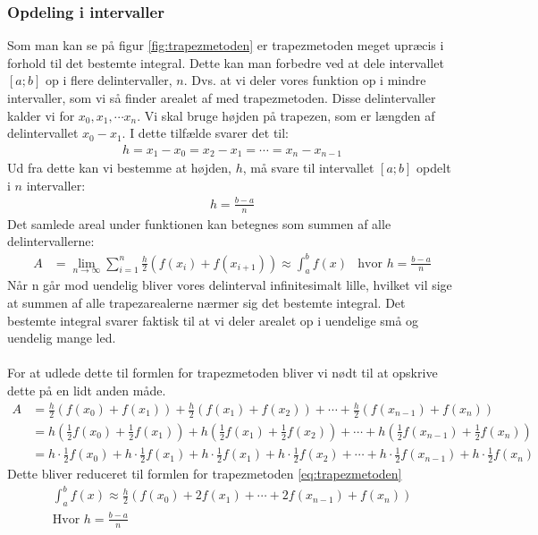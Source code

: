 \documentclass[12pt]{article}
\numberwithin{equation}{section}
\begin{document}
\subsubsection{Opdeling i intervaller}
\label{sec:opdelingtrapezmetoden}
Som man kan se på figur \ref{fig:trapezmetoden} er trapezmetoden meget upræcis i forhold til det bestemte integral. Dette kan man forbedre ved at dele intervallet $[a;b]$ op i flere delintervaller, $n$. Dvs. at vi deler vores funktion op i mindre intervaller, som vi så finder arealet af med trapezmetoden. Disse delintervaller kalder vi for $x_0, x_1, \cdots x_n$. Vi skal bruge højden på trapezen, som er længden af delintervallet $x_0 - x_1$. I dette tilfælde svarer det til:
\begin{align}
h = x_1-x_0 = x_2-x_1 = \cdots = x_n - x_{n-1}
\end{align}
Ud fra dette kan vi bestemme at højden, $h$, må svare til intervallet $[a;b]$ opdelt i $n$ intervaller:
\begin{align}
h=\frac{b-a}{n}
\end{align}
Det samlede areal under funktionen kan betegnes som summen af alle delintervallerne:
\begin{align}
A &= \lim\limits_{n \rightarrow \infty} \sum_{i=1}^{n} \frac{h}{2}(f(x_{i}) + f(x_{i+1}))
\approx \int_{a}^{b}f(x) &\text{hvor }h=\frac{b-a}{n}
\end{align}
Når n går mod uendelig bliver vores delinterval infinitesimalt lille, hvilket vil sige at summen af alle trapezarealerne nærmer sig det bestemte integral. Det bestemte integral svarer faktisk til at vi deler arealet op i uendelige små og uendelig mange led.
\\\\
For at udlede dette til formlen for trapezmetoden bliver vi nødt til at opskrive dette på en lidt anden måde.
\begin{align}
A &= \frac{h}{2}(f(x_0)+ f(x_1)) + \frac{h}{2}(f(x_1)+ f(x_2)) + \cdots + \frac{h}{2}(f(x_{n-1})+ f(x_n)) \nonumber
\\ &= h(\frac{1}{2}f(x_0) + \frac{1}{2}f(x_1)) + h(\frac{1}{2}f(x_1) + \frac{1}{2}f(x_2)) + \cdots + h(\frac{1}{2}f(x_{n-1}) + \frac{1}{2}f(x_n)) \nonumber
\\ &= h \cdot \frac{1}{2}f(x_0) + h \cdot \frac{1}{2}f(x_1) + h \cdot \frac{1}{2}f(x_1) + h \cdot \frac{1}{2}f(x_2) + \cdots + h \cdot \frac{1}{2}f(x_{n-1}) + h \cdot \frac{1}{2}f(x_n) \nonumber
\end{align}
Dette bliver reduceret til formlen for trapezmetoden \eqref{eq:trapezmetoden}
\begin{align}
\label{eq:trapezmetoden}
\boxed{\int_{a}^{b}f(x) \approx \frac{h}{2}(f(x_0) + 2f(x_1) + \cdots + 2f(x_{n-1}) + f(x_n))} \\ \text{Hvor } h=\frac{b-a}{n} \nonumber
\end{align}
\end{document}

